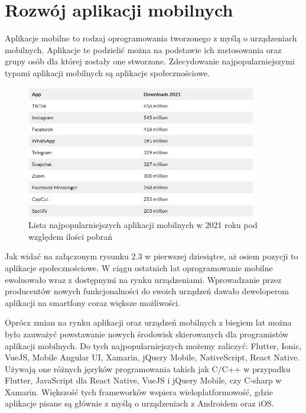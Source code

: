 \documentclass[a4paper,12pt,oneside]{book}
\begin{document}
	\section{Rozwój aplikacji mobilnych}
	Aplikacje mobilne to rodzaj oprogramowania tworzonego z myślą o urządzeniach mobilnych. Aplikacje te podzielić można na podstawie ich zastosowania oraz grupy osób dla której zostały one stworzone. Zdecydowanie najpopularniejszymi typami aplikacji mobilnych są aplikacje społecznościowe.
	
	\begin{figure}[h]
		\centering
		\includegraphics[width=0.9\textwidth]{grafika/most_popular_apps_2021.png}
		\caption{Lista najpopularniejszych aplikacji mobilnych w 2021 roku pod względem ilości pobrań}
	\end{figure}

	Jak widać na załączonym rysunku 2.3 w pierwszej dziesiątce, aż osiem pozycji to aplikacje społecznościowe.  W ciągu ostatnich lat oprogramowanie mobilne ewoluowało wraz z dostępnymi na rynku urządzeniami. Wprowadzanie przez producentów nowych funkcjonalności do swoich urządzeń dawało deweloperom aplikacji na smartfony coraz większe możliwości. 
	
	\newpage
	
	Oprócz zmian na rynku aplikacji oraz urządzeń mobilnych z biegiem lat można było zauważyć powstawanie nowych środowisk skierowanych dla programistów aplikacji mobilnych. Do tych najpopularniejszych możemy zaliczyć: Flutter, Ionic, VueJS, Mobile Angular UI, Xamarin, jQuery Mobile, NativeScript, React Native. Używają one różnych języków programowania takich jak C/C++ w przypadku Flutter, JavaScript dla React Native, VueJS i jQuery Mobile, czy C-sharp w Xamarin. Większość tych frameworków wspiera wieloplatformowość, gdzie aplikacje pisane są głównie z myślą o urządzeniach z Androidem oraz iOS.
	
\end{document}
